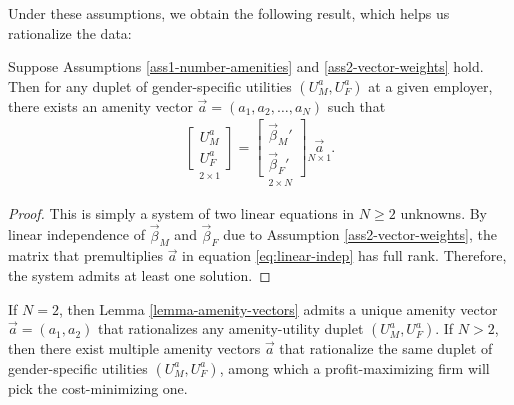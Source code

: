 Under these assumptions, we obtain the following result, which helps us rationalize the data:
%
\newcommand{\LemmaExistenceOfAmenityVector}[1]{%
    Suppose Assumptions \ref{ass1-number-amenities} and \ref{ass2-vector-weights} hold. Then for any duplet of gender-specific utilities $\left(U_{M}^{a},U_{F}^{a}\right)$ at a given employer, there exists an amenity vector $\vec{a}=\left(a_{1},a_{2},\ldots,a_{N}\right)$
    such that
    \begin{align}
        \underset{2\times1}{\left[\begin{array}{c}
            U_{M}^{a}\\
            U_{F}^{a}
        \end{array}\right]}=\underset{2\times N}{\left[\begin{array}{c}
            \vec{\beta}_{M}'\\
            \vec{\beta}_{F}'
        \end{array}\right]}\underset{N\times1}{\vec{a}}. \label{#1}
    \end{align}
}
%
\begin{lemma}
    \label{lemma-amenity-vectors}
    \LemmaExistenceOfAmenityVector{eq:linear-indep}
\end{lemma}
%
\begin{proof}
    This is simply a system of two linear equations in $N \ge 2$ unknowns. By linear independence of $\vec{\beta}_{M}$ and $\vec{\beta}_{F}$ due to Assumption \ref{ass2-vector-weights}, the matrix that premultiplies $\vec{a}$ in equation \eqref{eq:linear-indep} has full rank. Therefore, the system admits at least one solution.
\end{proof}
%
If $N = 2$, then Lemma \ref{lemma-amenity-vectors} admits a unique amenity vector $\vec{a}=\left(a_{1},a_{2}\right)$ that rationalizes any amenity-utility duplet $\left(U_{M}^{a},U_{F}^{a}\right)$. If $N>2$, then there exist multiple amenity vectors $\vec{a}$ that rationalize the same duplet of gender-specific utilities $\left(U_{M}^{a},U_{F}^{a}\right)$, among which a profit-maximizing firm will pick the cost-minimizing one.


